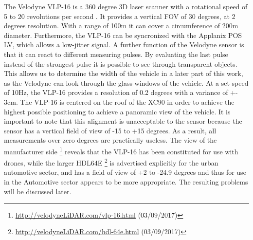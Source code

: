 The Velodyne VLP-16 is a 360 degree 3D laser scanner with a rotational speed of 5 to 20 revolutions per second \cite{manVEL}.
It provides a vertical FOV of 30 degrees, at 2 degrees resolution.
With a range of 100m it can cover a circumference of 200m diameter. 
Furthermore, the VLP-16 can be syncronized with the Applanix POS LV, which allows a low-jitter signal. 
A further function of the Velodyne sensor is that it can react to different measuring pulses. 
By evaluating the last pulse instead of the strongest pulse it is possible to see through transparent objects. 
This allows us to determine the width of the vehicle in a later part of this work, as the Velodyne can look through the glass windows of the vehicle. 
At a set speed of 10Hz, the VLP-16 provides a resolution of 0.2 degrees with a variance of +- 3cm. 
The VLP-16 is centered on the roof of the XC90 in order to achieve the highest possible positioning to achieve a panoramic view of the vehicle.
It is important to note that this alignment is unacceptable to the sensor because the sensor has a vertical field of view of -15 to +15 degrees.
As a result, all measurements over zero degrees are practically useless. The view of the manufacturer side
\footnote{\url{http://velodyneLiDAR.com/vlp-16.html} (03/09/2017)}
reveals that the VLP-16 has been constituted for use with drones, while the larger HDL64E
\footnote{\url{http://velodyneLiDAR.com/hdl-64e.html} (03/09/2017)}
is advertised explicitly for the urban automotive sector, and has a field of view of +2 to -24.9 degrees and thus for use in the
Automotive sector appears to be more appropriate. The resulting problems will be discussed later.







